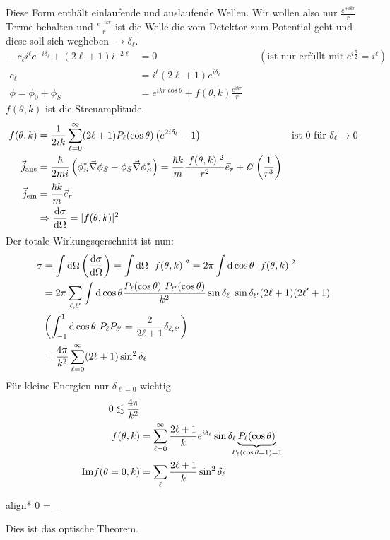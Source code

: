 	Diese Form enthält einlaufende und auslaufende Wellen. Wir wollen also nur $\frac{e^{+ikr}}{r}$ Terme behalten und $\frac{e^{-ikr}}{r}$ ist die Welle die vom Detektor zum Potential geht und diese soll sich wegheben $\rightarrow \delta_\ell$.
		\begin{align*}
			-c_\ell i^\ell e^{-i\delta_\ell} + (2 \ell + 1) i^{-2\ell} &= 0 &
			&(\text{ist nur erfüllt mit } e^{i\frac{\pi}{2}} = i^\ell) \\
			c_\ell &= i^{\ell} (2\ell + 1) e^{i \delta_\ell}\\
			\phi = \phi_0 + \phi_S &= e^{ikr \cos \theta} + f(\theta, k) \frac{e^{ikr}}{r}
		\end{align*}
	$f(\theta,k)$ ist die Streuamplitude.
		\begin{align*}
			f(\theta,k) &= \frac{1}{2ik} \sum_{\ell = 0}^{\infty} (2 \ell +1) P_\ell (\cos \theta) 
			\left(e^{2i\delta_\ell} - 1\right) & 
			&\text{ist } 0 \text{ für } \delta_\ell \rightarrow 0 \\
			\vec{j}_{\text{aus}} &= 
			\frac{\hbar}{2mi} \left(\phi_S^* \vec{\nabla} \phi_S
				- \phi_S \vec{\nabla} \phi_S^*
			\right) 
			= \frac{\hbar k}{m} \frac{|f(\theta, k)|^2}{r^2} \vec{e}_r
			+ \mathscr{O}\left(\frac{1}{r^3}\right) \\
			\vec{j}_{\text{ein}} &= \frac{\hbar k}{m} \vec{e}_r \\
			&\Rightarrow \frac{\mathrm{d} \sigma}{\mathrm{d} \Omega} = |f(\theta, k)|^2
		\end{align*}
	Der totale Wirkungsqerschnitt ist nun:
		\begin{align*}
			\sigma &= \int \mathrm{d} \Omega \left(\frac{\mathrm{d} \sigma}{\mathrm{d} \Omega}\right)
			= \int \mathrm{d} \Omega ~|f(\theta, k)|^2 
			= 2 \pi \int \mathrm{d} \cos \theta ~|f(\theta, k)|^2 \\
			&= 2 \pi \sum_{\ell, \ell'} \int \mathrm{d} \cos \theta 
			\frac{P_\ell (\cos \theta)~P_{\ell'} (\cos \theta)}{k^2} 
			\sin\delta_\ell ~\sin\delta_{\ell'} (2\ell+1) (2\ell' +1) \\
			&\left(
				\int_{-1}^{1} \mathrm{d} \cos \theta ~ P_\ell P_{\ell'} = \frac{2}{2 \ell + 1} \delta_{\ell,\ell'}
			\right) \\
			&= \frac{4 \pi}{k^2} \sum_{\ell = 0}^{\infty}
			(2 \ell + 1) \sin^2 \delta_\ell
		\end{align*}
	Für kleine Energien nur $\delta_{\ell=0}$ wichtig
		\begin{align*}
			0 \lesssim \frac{4 \pi}{k^2} \\
			f(\theta, k) &= \sum_{\ell = 0}^{\infty} \frac{2 \ell + 1}{k} e^{i \delta_\ell}
			\sin \delta_\ell 
			\underbrace{P_\ell (\cos \theta)}_{\mathclap{P_\ell(\cos \theta = 1) = 1}} \\
			\mathrm{Im} f(\theta =0, k) &= \sum_\ell \frac{2 \ell + 1}{k} \sin^2 \delta_\ell
		\end{align*}
		\begin{empheq}[box=\boxed]{align*}
			0 =  
			_{}
		\end{empheq}
	Dies ist das optische Theorem.
	
